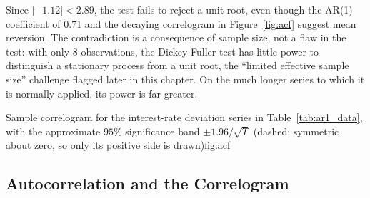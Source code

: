 \documentclass[../ai_in_finance]{subfiles}
\begin{document}
Since $|-1.12| < 2.89$, the test fails to reject a unit root, even though the AR(1) coefficient of 0.71 and the decaying correlogram in Figure~\ref{fig:acf} suggest mean reversion. The contradiction is a consequence of sample size, not a flaw in the test: with only 8 observations, the Dickey-Fuller test has little power to distinguish a stationary process from a unit root, the ``limited effective sample size'' challenge flagged later in this chapter. On the much longer series to which it is normally applied, its power is far greater.

\begin{bookfigure}{Sample correlogram for the interest-rate deviation series in Table~\ref{tab:ar1_data}, with the approximate $95\%$ significance band $\pm 1.96/\sqrt{T}$ (dashed; symmetric about zero, so only its positive side is drawn)}{fig:acf}
\end{bookfigure}

\subsection{Autocorrelation and the Correlogram}
\label{sec:acf-section}
\end{document}
